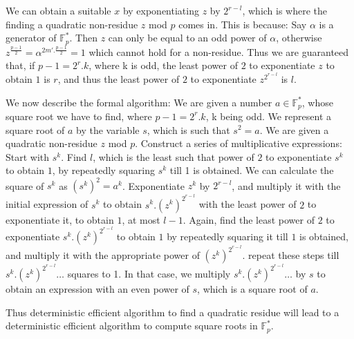 \documentclass{report}
\begin{document}
We can obtain a suitable $x$ by exponentiating $z$ by $2^{r-l}$, which is where the finding a quadratic non-residue $z$ mod $p$ comes in. This is because: Say $\alpha$ is a generator of $\mathbb{F}^*_p$. Then $z$ can only be equal to an odd power of $\alpha$, otherwise $z^{\frac{p-1}{2}}=\alpha^{2m'.\frac{p-1}{2}}=1$ which cannot hold for a non-residue. Thus we are guaranteed that, if $p-1 = 2^r.k$, where k is odd, the least power of $2$ to exponentiate $z$ to obtain $1$ is $r$, and thus the least power of $2$ to exponentiate $z^{2^{r-l}}$ is $l$.

We now describe the formal algorithm: We are given a number $a\in \mathbb{F}^*_p$, whose square root we have to find, where $p-1 = 2^r.k$, k being odd.
We represent a square root of $a$ by the variable $s$, which is such that $s^2=a$. We are given a quadratic non-residue $z$ mod $p$. Construct a series of multiplicative expressions: Start with $s^k$. Find $l$, which is the least such that power of $2$ to exponentiate $s^k$ to obtain $1$, by repeatedly squaring $s^k$ till 1 is obtained. We can calculate the square of $s^k$ as $(s^k)^2=a^k$. Exponentiate $z^k$ by $2^{r-l}$, and multiply it with the initial expression of $s^k$ to obtain $s^k.(z^k)^{2^{r-l}}$ with the least power of $2$ to exponentiate it, to obtain $1$, at most $l-1$. Again, find the least power of $2$ to exponentiate $s^k.(z^k)^{2^{r-l}}$ to obtain $1$ by repeatedly squaring it till $1$ is obtained, and multiply it with the appropriate power of $(z^k)^{2^{r-l}}$. repeat these steps till $s^k.(z^k)^{2^{r-l}}\ldots$ squares to 1. In that case, we multiply $s^k.(z^k)^{2^{r-l}}\ldots$ by $s$ to obtain an expression with an even power of $s$, which is a square root of $a$.

Thus deterministic efficient algorithm to find a quadratic residue will lead to a deterministic efficient algorithm to compute square roots in $\mathbb{F}^*_p$.

%
\end{document}
